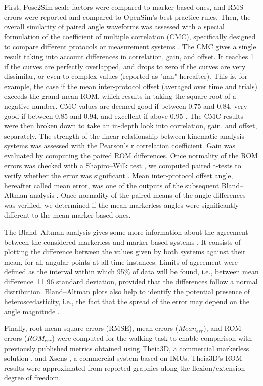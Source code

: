 First, Pose2Sim scale factors were compared to marker-based ones, and RMS errors were reported and compared to OpenSim’s best practice rules. Then, the overall similarity of paired angle waveforms was assessed with a special formulation of the coefficient of multiple correlation (CMC), specifically designed to compare different protocols or measurement systems \cite{Ferrari2010}. The CMC gives a single result taking into account differences in correlation, gain, and offset. It reaches 1 if the curves are perfectly overlapped, and drops to zero if the curves are very dissimilar, or even to complex values (reported as "nan" hereafter). This is, for example, the case if the mean inter-protocol offset (averaged over time and trials) exceeds the grand mean ROM, which results in taking the square root of a negative number. CMC values are deemed good if between 0.75 and 0.84, very good if between 0.85 and 0.94, and excellent if above 0.95 \cite{Ferrari2010}. The CMC results were then broken down to take an in-depth look into correlation, gain, and offset, separately. The strength of the linear relationship between kinematic analysis systems was assessed with the Pearson’s r correlation coefficient. Gain was evaluated by computing the paired ROM differences. Once normality of the ROM errors was checked with a Shapiro–Wilk test \cite{Shapiro1965}, we computed paired t-tests to verify whether the error was significant \cite{Student1908}. Mean inter-protocol offset angle, hereafter called mean error, was one of the outputs of the subsequent Bland–Altman analysis \cite{Bland1986,Atkinson1998}. Once normality of the paired means of the angle differences was verified, we determined if the mean markerless angles were significantly different to the mean marker-based ones.

The Bland–Altman analysis gives some more information about the agreement between the considered markerless and marker-based systems \cite{Bland1986,Atkinson1998}. It consists of plotting the difference between the values given by both systems against their mean, for all angular points at all time instances. Limits of agreement were defined as the interval within which 95\% of data will be found, i.e., between mean difference ±1.96 standard deviation, provided that the differences follow a normal distribution. Bland–Altman plots also help to identify the potential presence of heteroscedasticity, i.e., the fact that the spread of the error may depend on the angle magnitude \cite{Atkinson1998}.

Finally, root-mean-square errors (RMSE), mean errors (\(Mean_{err}\)), and ROM errors (\(ROM_{err}\)) were computed for the walking task to enable comparison with previously published metrics obtained using Theia3D, a commercial markerless solution \cite{Kanko2021b}, and Xsens \cite{Zhang2013}, a commercial system based on IMUs. Theia3D’s ROM results were approximated from reported graphics along the flexion/extension degree of freedom.


